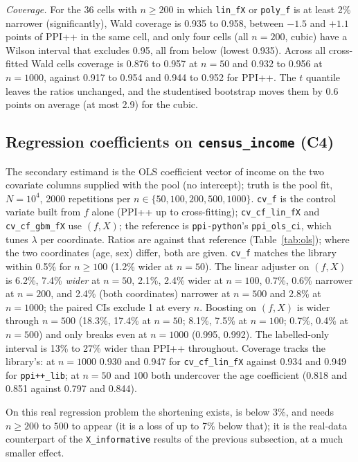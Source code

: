\emph{Coverage.} For the 36 cells with $n\ge200$ in which \texttt{lin\_fX} or \texttt{poly\_f} is at least 2\% narrower (significantly), Wald coverage is 0.935 to 0.958, between $-1.5$ and $+1.1$ points of PPI++ in the same cell, and only four cells (all $n=200$, cubic) have a Wilson interval that excludes 0.95, all from below (lowest 0.935).
Across all cross-fitted Wald cells coverage is 0.876 to 0.957 at $n=50$ and 0.932 to 0.956 at $n=1000$, against 0.917 to 0.954 and 0.944 to 0.952 for PPI++. The $t$ quantile leaves the ratios unchanged, and the studentised bootstrap moves them by 0.6 points on average (at most 2.9) for the cubic.

\subsection{Regression coefficients on \texttt{census\_income} (C4)}
\label{sec:ols}
The secondary estimand is the OLS coefficient vector of income on the two covariate columns supplied with the pool (no intercept); truth is the pool fit, $N=10^4$, 2000 repetitions per $n\in\{50,100,200,500,1000\}$.
\texttt{cv\_f} is the control variate built from $f$ alone (PPI++ up to cross-fitting); \texttt{cv\_cf\_lin\_fX} and \texttt{cv\_cf\_gbm\_fX} use $(f,X)$; the reference is \texttt{ppi-python}'s \texttt{ppi\_ols\_ci}, which tunes $\lambda$ per coordinate.
Ratios are against that reference (Table~\ref{tab:ols}); where the two coordinates (age, sex) differ, both are given.
\texttt{cv\_f} matches the library within 0.5\% for $n\ge100$ (1.2\% wider at $n=50$). The linear adjuster on $(f,X)$ is 6.2\%, 7.4\% \emph{wider} at $n=50$, 2.1\%, 2.4\% wider at $n=100$, 0.7\%, 0.6\% narrower at $n=200$, and 2.4\% (both coordinates) narrower at $n=500$ and 2.8\% at $n=1000$; the paired CIs exclude 1 at every $n$.
Boosting on $(f,X)$ is wider through $n=500$ (18.3\%, 17.4\% at $n=50$; 8.1\%, 7.5\% at $n=100$; 0.7\%, 0.4\% at $n=500$) and only breaks even at $n=1000$ (0.995, 0.992). The labelled-only interval is 13\% to 27\% wider than PPI++ throughout.
Coverage tracks the library's: at $n=1000$ 0.930 and 0.947 for \texttt{cv\_cf\_lin\_fX} against 0.934 and 0.949 for \texttt{ppi++\_lib}; at $n=50$ and $100$ both undercover the age coefficient (0.818 and 0.851 against 0.797 and 0.844).

\begin{table}[t]
\caption{OLS of income on (age, sex) on \texttt{census\_income}: paired width ratio to \texttt{ppi-python} PPI++ ($<1$ narrower) and coverage of 95\% intervals (Monte-Carlo SE about 0.005); 2000 repetitions, $N=10^4$.}
\label{tab:ols}
\centering

\end{table}

On this real regression problem the shortening exists, is below 3\%, and needs $n\ge200$ to $500$ to appear (it is a loss of up to 7\% below that); it is the real-data counterpart of the \texttt{X\_informative} results of the previous subsection, at a much smaller effect.

